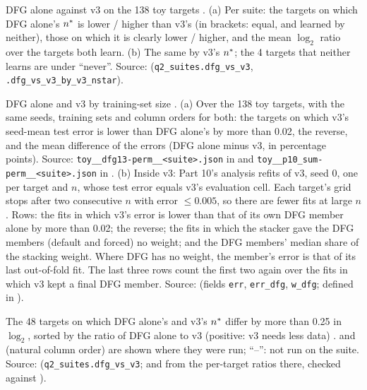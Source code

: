 \begin{table}[t]
\centering{\footnotesize\setlength{\tabcolsep}{5pt}
}
\caption{DFG alone against v3 on the 138 toy targets . (a) Per suite: the targets on which DFG alone's $\nstar$ is lower / higher than v3's (in brackets: equal, and learned by neither), those on which it is clearly lower / higher, and the mean $\log_2$ ratio over the targets both learn. (b) The same by v3's $\nstar$; the 4 targets that neither learns are under ``never''. Source:  (\texttt{q2\_suites.dfg\_vs\_v3}, \texttt{.dfg\_vs\_v3\_by\_v3\_nstar}).}
\label{tab:v3}
\end{table}

\begin{table}[t]
\centering{\footnotesize\setlength{\tabcolsep}{2.6pt}
}
\caption{DFG alone and v3 by training-set size . (a) Over the 138 toy targets, with the same seeds, training sets and column orders for both: the targets on which v3's seed-mean test error is lower than DFG alone's by more than 0.02, the reverse, and the mean difference of the errors (DFG alone minus v3, in percentage points). Source: \texttt{toy\_\_dfg13-perm\_\_<suite>.json} in  and \texttt{toy\_\_p10\_sum-perm\_\_<suite>.json} in . (b) Inside v3: Part 10's analysis refits of v3, seed 0, one per target and $n$, whose test error equals v3's evaluation cell. Each target's grid stops after two consecutive $n$ with error $\le0.005$, so there are fewer fits at large $n$. Rows: the fits in which v3's error is lower than that of its own DFG member alone by more than 0.02; the reverse; the fits in which the stacker gave the DFG members (default and forced) no weight; and the DFG members' median share of the stacking weight. Where DFG has no weight, the member's error is that of its last out-of-fold fit. The last three rows count the first two again over the fits in which v3 kept a final DFG member. Source:  (fields \texttt{err}, \texttt{err\_dfg}, \texttt{w\_dfg}; defined in ).}
\label{tab:v3-byn}
\end{table}

\begin{table}[t]
\centering{\footnotesize\setlength{\tabcolsep}{2.6pt}
}
\caption{The 48 targets on which DFG alone's and v3's $\nstar$ differ by more than 0.25 in $\log_2$, sorted by the ratio of DFG alone to v3 (positive: v3 needs less data) .  and  (natural column order) are shown where they were run; ``--'': not run on the suite. Source:  (\texttt{q2\_suites.dfg\_vs\_v3};  and  from the per-target ratios there, checked against ).}
\label{tab:v3-targets}
\end{table}

